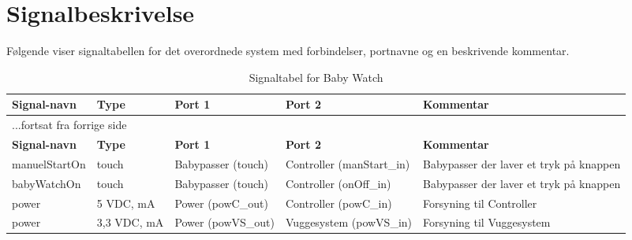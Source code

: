 

\section{Signalbeskrivelse} \label{overordnet:signalbeskrivelse}

Følgende viser  signaltabellen for det overordnede system  med forbindelser, portnavne og en beskrivende kommentar.

\begin{center}
\label{overordnet:signaltabel}
\begin{longtable}{|p{}|p{}|p{}|p{}|p{3cm}|}
\caption{Signaltabel for Baby Watch}\\
\hline
\textbf{Signal-navn}	&\textbf{Type} 		&\textbf{Port 1} 	&\textbf{Port 2} 			&\textbf{Kommentar} \\ \hline
\endfirsthead
\multicolumn{5}{l}{...fortsat fra forrige side} \\ \hline 
\textbf{Signal-navn}	&\textbf{Type} 		&\textbf{Port 1} 	&\textbf{Port 2} 			&\textbf{Kommentar} \\ \hline
\endhead


manuelStartOn
&touch
&Babypasser \newline (touch)
&Controller \newline (manStart\_in)
&Babypasser der laver et tryk på knappen
\\\hline

babyWatchOn
&touch
&Babypasser \newline (touch)
&Controller \newline (onOff\_in)
&Babypasser der laver et tryk på knappen
\\\hline

power
&5 VDC, \newline 1200 mA
&Power \newline(powC\_out)
&Controller \newline(powC\_in)
&Forsyning til Controller
\\\hline

power
&3,3 VDC, \newline 500 mA
&Power \newline(powVS\_out)
&Vuggesystem \newline(powVS\_in)
&Forsyning til Vuggesystem
\\\hline


\end{longtable}
\end{center}
